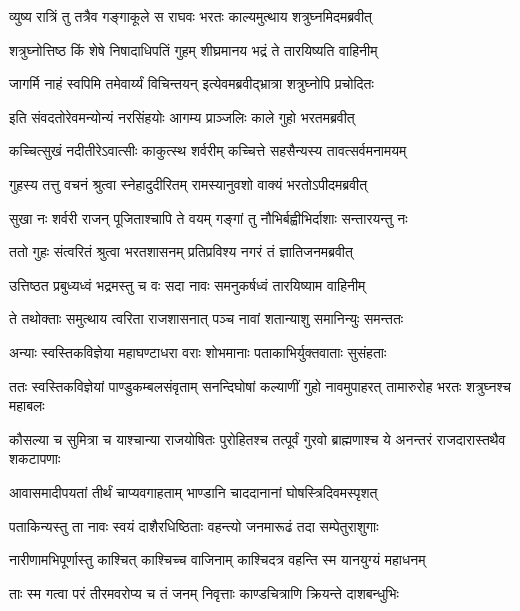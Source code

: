 
\twolineshloka
{व्युष्य रात्रिं तु तत्रैव गङ्गाकूले स राघवः}
{भरतः काल्यमुत्थाय शत्रुघ्नमिदमब्रवीत्} %

\twolineshloka
{शत्रुघ्नोत्तिष्ठ किं शेषे निषादाधिपतिं गुहम्}
{शीघ्रमानय भद्रं ते तारयिष्यति वाहिनीम्} %

\twolineshloka
{जागर्मि नाहं स्वपिमि तमेवार्य्यं विचिन्तयन्}
{इत्येवमब्रवीद्भ्रात्रा शत्रुघ्नोपि प्रचोदितः} %

\twolineshloka
{इति संवदतोरेवमन्योन्यं नरसिंहयोः}
{आगम्य प्राञ्जलिः काले गुहो भरतमब्रवीत्} %

\twolineshloka
{कच्चित्सुखं नदीतीरेऽवात्सीः काकुत्स्थ शर्वरीम्}
{कच्चित्ते सहसैन्यस्य तावत्सर्वमनामयम्} %

\twolineshloka
{गुहस्य तत्तु वचनं श्रुत्वा स्नेहादुदीरितम्}
{रामस्यानुवशो वाक्यं भरतोऽपीदमब्रवीत्} %

\twolineshloka
{सुखा नः शर्वरी राजन् पूजिताश्चापि ते वयम्}
{गङ्गां तु नौभिर्बह्वीभिर्दाशाः सन्तारयन्तु नः} %

\twolineshloka
{ततो गुहः संत्वरितं श्रुत्वा भरतशासनम्}
{प्रतिप्रविश्य नगरं तं ज्ञातिजनमब्रवीत्} %

\twolineshloka
{उत्तिष्ठत प्रबुध्यध्वं भद्रमस्तु च वः सदा}
{नावः समनुकर्षध्वं तारयिष्याम वाहिनीम्} %

\twolineshloka
{ते तथोक्ताः समुत्थाय त्वरिता राजशासनात्}
{पञ्च नावां शतान्याशु समानिन्युः समन्ततः} %

\twolineshloka
{अन्याः स्वस्तिकविज्ञेया महाघण्टाधरा वराः}
{शोभमानाः पताकाभिर्युक्तवाताः सुसंहताः} %

\threelineshloka
{ततः स्वस्तिकविज्ञेयां पाण्डुकम्बलसंवृताम्}
{सनन्दिघोषां कल्याणीं गुहो नावमुपाहरत्}
{तामारुरोह भरतः शत्रुघ्नश्च महाबलः} %

\threelineshloka
{कौसल्या च सुमित्रा च याश्चान्या राजयोषितः}
{पुरोहितश्च तत्पूर्वं गुरवो ब्राह्मणाश्च ये}
{अनन्तरं राजदारास्तथैव शकटापणाः} %

\twolineshloka
{आवासमादीपयतां तीर्थं चाप्यवगाहताम्}
{भाण्डानि चाददानानां घोषस्त्रिदिवमस्पृशत्} %

\twolineshloka
{पताकिन्यस्तु ता नावः स्वयं दाशैरधिष्ठिताः}
{वहन्त्यो जनमारूढं तदा सम्पेतुराशुगाः} %

\twolineshloka
{नारीणामभिपूर्णास्तु काश्चित् काश्चिच्च वाजिनाम्}
{काश्चिदत्र वहन्ति स्म यानयुग्यं महाधनम्} %

\twolineshloka
{ताः स्म गत्वा परं तीरमवरोप्य च तं जनम्}
{निवृत्ताः काण्डचित्राणि क्रियन्ते दाशबन्धुभिः} %

